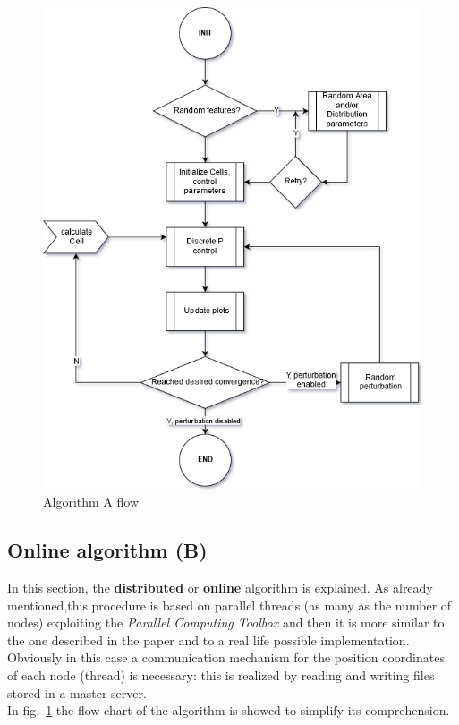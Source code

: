 \documentclass[a4paper,11pt,oneside]{book}
\begin{document}
	\begin{figure}
		
		\centering
		
		\includegraphics[scale=0.63]{figs/algorithmA.png}
		
		\caption{Algorithm A flow}\label{fig:algorithmA.png}
		
	\end{figure}
	
	\subsection{Online algorithm (B)}
	
	In this section, the \textbf{distributed} or \textbf{online} algorithm is explained. As already mentioned,this procedure is based on parallel threads (as many as the number of nodes) exploiting the \textit{Parallel Computing Toolbox} and then it is more similar to the one described in the paper \cite{K1} and to a real life possible implementation. Obviously in this case a communication mechanism for the position coordinates of each node (thread) is necessary: this is realized by reading and writing files stored in a master server.\\
	In fig.~\ref{fig:algorithmA.png} the flow chart of the algorithm is showed to simplify its comprehension.\\
	
\end{document}
